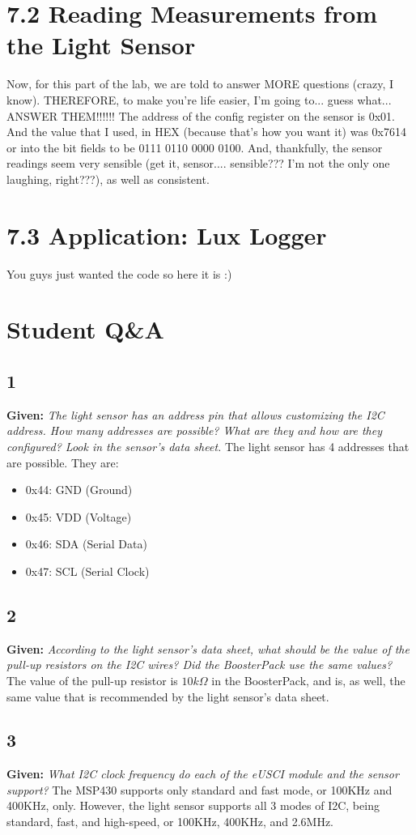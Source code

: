 \documentclass{article}
\begin{document}
\section{7.2 Reading Measurements from the Light Sensor}
Now, for this part of the lab, we are told to answer MORE questions (crazy, I know). THEREFORE, to make you're life easier, I'm going to... guess what... ANSWER THEM!!!!!! The address of the config register on the sensor is 0x01. And the value that I used, in HEX (because that's how you want it) was 0x7614 or into the bit fields to be 0111 0110 0000 0100. And, thankfully, the sensor readings seem very sensible (get it, sensor.... sensible??? I'm not the only one laughing, right???), as well as consistent.

\pagebreak

\section{7.3 Application: Lux Logger}
You guys just wanted the code so here it is :)

\pagebreak

\section{Student Q\&A}
\subsection{1}
\textbf{Given:} \textit{The light sensor has an address pin that allows customizing the I2C address. How many addresses are possible? What are they and how are they configured? Look in the sensor’s data sheet.}
\newline
The light sensor has 4 addresses that are possible. They are:
\begin{itemize}
  \item 0x44: GND (Ground)
  \item 0x45: VDD (Voltage)
  \item 0x46: SDA (Serial Data)
  \item 0x47: SCL (Serial Clock)
\end{itemize}

\subsection{2}
\textbf{Given:} \textit{According to the light sensor’s data sheet, what should be the value of the pull-up resistors on the I2C wires? Did the BoosterPack use the same values?}
\newline
The value of the pull-up resistor is $10k\Omega$ in the BoosterPack, and is, as well, the same value that is recommended by the light sensor's data sheet.

\subsection{3}
\textbf{Given:} \textit{What I2C clock frequency do each of the eUSCI module and the sensor support?}
\newline
The MSP430 supports only standard and fast mode, or 100KHz and 400KHz, only. However, the light sensor supports all 3 modes of I2C, being standard, fast, and high-speed, or 100KHz, 400KHz, and 2.6MHz.
\end{document}
